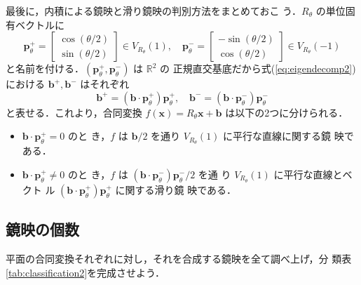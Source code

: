\documentclass[11pt, uplatex, dvipdfmx, titlepage]{jsarticle}
\theoremstyle{definition}
\newtheorem{theorem}{定理}[section]
\newtheorem*{definition}{定義}
\begin{document}
 最後に，内積による鏡映と滑り鏡映の判別方法をまとめておこ
 う．$R_{\theta}$ の単位固有ベクトルに
 \[
   \bm{p}^{+}_{\theta} = \left[
     \begin{array}{r}
       \cos(\theta/2)\\
       \sin(\theta/2)
     \end{array}
   \right] \in V_{R_{\theta}}(1), \quad \bm{p}^{-}_{\theta} = \left[
     \begin{array}{r}
       -\sin(\theta/2)\\
       \cos(\theta/2)
     \end{array}
   \right] \in V_{R_{\theta}}(-1)
 \]
 と名前を付ける．$\left(\bm{p}_{\theta}^{+}, \bm{p}_{\theta}^{-}\right)$ は $\mathbb{R}^2$ の
 正規直交基底だから式(\ref{eq:eigendecomp2})における $\bm{b}^{+},
 \bm{b}^{-}$ はそれぞれ
 \[
   \bm{b}^{+} = (\bm{b} \cdot \bm{p}_{\theta}^{+}) \bm{p}_{\theta}^{+} ,
   \quad  \bm{b}^{-} =  (\bm{b}\cdot \bm{p}_{\theta}^{-})\bm{p}_{\theta}^{-}
 \]
 と表せる．これより，合同変換 $f(\bm{x}) = R_{\theta} \bm{x} + \bm{b}$
 は以下の2つに分けられる．
 \begin{itemize}
   \setlength{\itemsep}{1zh}
 \item $\bm{b} \cdot \bm{p}_{\theta}^{+}=0$ のと
   き，$f$ は $\bm{b}/2$ を通り $V_{R_{\theta}}(1)$ に平行な直線に関する鏡
   映である．
   
 \item $\bm{b} \cdot  \bm{p}_{\theta}^{+} \neq 0$ のと
   き，$f$ は
   $\left(\bm{b} \cdot \bm{p}_{\theta}^{-}\right)\bm{p}_{\theta}^{-}/2$ を通
   り $V_{R_{\theta}}(1)$ に平行な直線とベクト
   ル $(\bm{b}\cdot \bm{p}_{\theta}^{+})\bm{p}_{\theta}^{+}$ に関する滑り鏡
   映である．
 \end{itemize}



\subsection{鏡映の個数}

平面の合同変換それぞれに対し，それを合成する鏡映を全て調べ上げ，分
類表\ref{tab:classification2}を完成させよう．


\end{document}
